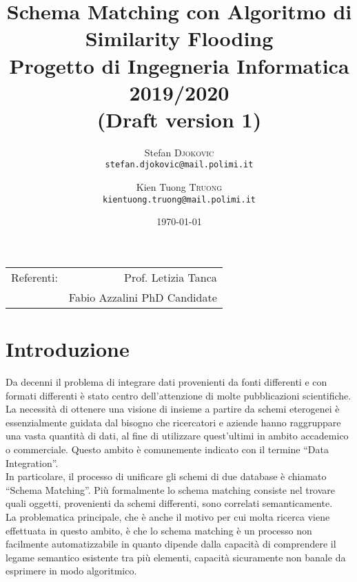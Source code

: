 \documentclass{article}
\title{Schema Matching con Algoritmo di Similarity Flooding \\ Progetto di Ingegneria Informatica 2019/2020\\
\large (Draft version 1)} %
\author{Stefan \textsc{Djokovic} \\
	\texttt{stefan.djokovic@mail.polimi.it}
	\and Kien Tuong \textsc{Truong} \\
	\texttt{kientuong.truong@mail.polimi.it}} %
\date{\today} %
\begin{document}
\maketitle %

\begin{center}
\begin{tabular}{l r}
Referenti: & Prof. Letizia Tanca\\ %
& Fabio Azzalini PhD Candidate
\end{tabular}
\end{center}



\section{Introduzione}

Da decenni il problema di integrare dati provenienti da fonti differenti e con formati differenti è stato centro dell’attenzione di molte pubblicazioni scientifiche. La necessità di ottenere una visione di insieme a partire da schemi eterogenei è essenzialmente guidata dal bisogno che ricercatori e aziende hanno raggruppare una vasta quantità di dati, al fine di utilizzare quest’ultimi in ambito accademico o commerciale. Questo ambito è comunemente indicato con il termine “Data Integration”.\\

In particolare, il processo di unificare gli schemi di due database è chiamato “Schema Matching”. Più formalmente lo schema matching consiste nel trovare quali oggetti, provenienti da schemi differenti, sono correlati semanticamente.\\

La problematica principale, che è anche il motivo per cui molta ricerca viene effettuata in questo ambito, è che lo schema matching è un processo non facilmente automatizzabile in quanto dipende dalla capacità di comprendere il legame semantico esistente tra più elementi, capacità sicuramente non banale da esprimere in modo algoritmico.\\
\end{document}
